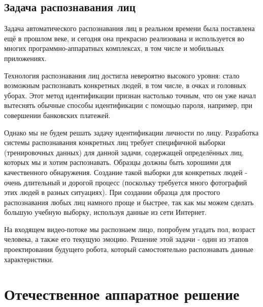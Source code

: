 \documentclass[12pt,a4paper]{scrartcl}
\begin{document}
		\subsection{Задача распознавания лиц}
		
			Задача автоматического распознавания лиц в реальном времени была поставлена ещё в прошлом веке, и сегодня она прекрасно реализована и используется во многих программно-аппаратных комплексах, в том числе и мобильных приложениях.
			
			Технология распознавания лиц достигла невероятно высокого уровня: стало возможным распознавать конкретных людей, в том числе, в очках и головных уборах. Этот метод идентификации признан настолько точным, что он уже начал вытеснять обычные способы идентификации с помощью пароля, например, при совершении банковских платежей\cite{bib:Smart_Payment_China}. 
			
			Однако мы не будем решать задачу идентификации личности по лицу. Разработка системы распознавания конкретных лиц требует специфичной выборки (тренировочных данных) для данной задачи, содержащей определённых лиц, которых мы и хотим распознавать. Образцы должны быть хорошими для качественного обнаружения. Создание такой выборки для конкретных людей - очень длительный и дорогой процесс (поскольку требуется много фотографий этих людей в разных ситуациях). При создании образца для простого распознавания любых лиц намного проще и быстрее, так как мы можем сделать большую учебную выборку, используя данные из сети Интернет.
			
			На входящем видео-потоке мы распознаем лицо, попробуем угадать пол, возраст человека, а также его текущую эмоцию. Решение этой задачи - один из этапов проектирования будущего робота, который самостоятельно распознавать данные характеристики\cite{bib:Elise_CPU_Desc}.
		
		

\section{Отечественное аппаратное решение}
\end{document}
